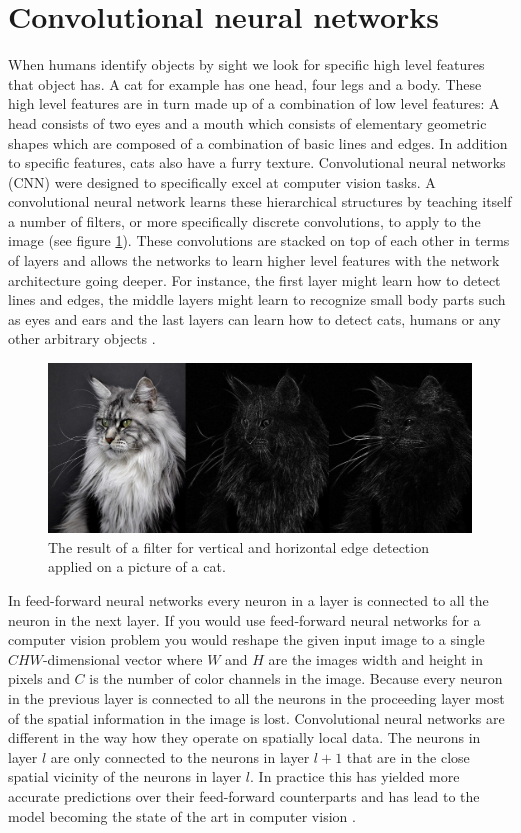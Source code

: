 \documentclass[a4paper, twoside]{article}
\begin{document}
\section{Convolutional neural networks}
When humans identify objects by sight we look for specific high level features that object has. A cat for example has one head, four legs and a body. These high level features are in turn made up of a combination of low level features: A head consists of two eyes and a mouth which consists of elementary geometric shapes which are composed of a combination of basic lines and edges. In addition to specific features, cats also have a furry texture. Convolutional neural networks (CNN) were designed to specifically excel at computer vision tasks. A convolutional neural network learns these hierarchical structures by teaching itself a number of filters, or more specifically discrete convolutions, to apply to the image (see figure \ref{figkatter}). These convolutions are stacked on top of each other in terms of layers and allows the networks to learn higher level features with the network architecture going deeper. For instance, the first layer might learn how to detect lines and edges, the middle layers might learn to recognize small body parts such as eyes and ears and the last layers can learn how to detect cats, humans or any other arbitrary objects \cite{cs231n}.

\begin{figure}[h]
	\centering
  		\includegraphics[scale=0.33]{katter.png}
  	\caption{The result of a filter for vertical and horizontal edge detection applied on a picture of a cat.} \label{figkatter}
\end{figure}

In feed-forward neural networks every neuron in a layer is connected to all the neuron in the next layer. If you would use feed-forward neural networks for a computer vision problem you would reshape the given input image to a single $CHW$-dimensional vector where $W$ and $H$ are the images width and height in pixels and $C$ is the number of color channels in the image. Because every neuron in the previous layer is connected to all the neurons in the proceeding layer most of the spatial information in the image is lost. Convolutional neural networks are different in the way how they operate on spatially local data. The neurons in layer $l$ are only connected to the neurons in layer $l+1$ that are in the close spatial vicinity of the neurons in layer $l$. In practice this has yielded more accurate predictions over their feed-forward counterparts and has lead to the model becoming the state of the art in computer vision \cite{cs231n} \cite{convmath} \cite{convarithmetic}.
\end{document}
